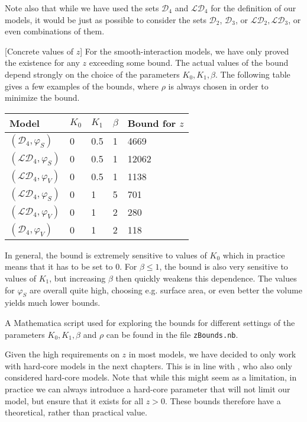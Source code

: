 Note also that while we have used the sets $\mathcal D_4$ and $\mathcal {LD}_4$ for the definition of our models, it would be just as possible to consider the sets $\mathcal D_2$, $\mathcal D_3$, or $\mathcal {LD}_2, \mathcal {LD}_3$, or even combinations of them.

\begin{remark}\label{r:zMathematica}[Concrete values of $z$]
	For the smooth-interaction models, we have only proved the existence for any $z$ exceeding some bound. The actual values of the bound depend strongly on the choice of the parameters $K_0,K_1,\beta$. The following table gives a few examples of the bounds, where $\rho$ is always chosen in order to minimize the bound.
	\begin{center}
	\begin{tabular}{ l l l l l }
		Model & $K_0$ & $K_1$ & $\beta$ & Bound for $z$ \\
		\hline
		$(\mathcal D_4,\varphi_S)$ &  0 & 0.5 & 1 & 4669 \\
		$(\mathcal {LD}_4,\varphi_S)$ &  0 & 0.5 & 1 & 12062 \\
		$(\mathcal {LD}_4,\varphi_{V})$ &  0 & 0.5 & 1 & 1138 \\
		$(\mathcal {LD}_4,\varphi_S)$ &  0 & 1 & 5 & 701 \\
		$(\mathcal {LD}_4,\varphi_V)$ &  0 & 1 & 2 & 280 \\
		$(\mathcal {D}_4,\varphi_V)$ &  0 & 1 & 2 & 118 \\
	\end{tabular}
	\end{center}
	In general, the bound is extremely sensitive to values of $K_0$ which in practice means that it has to be set to $0$. For $\beta \leq 1$, the bound is also very sensitive to values of $K_1$, but increasing $\beta$ then quickly weakens this dependence. The values for $\varphi_S$ are overall quite high, choosing e.g. surface area, or even better the volume yields much lower bounds.

	A Mathematica script used for exploring the bounds for different settings of the parameters $K_0,K_1,\beta$ and $\rho$ can be found in the file \texttt{zBounds.nb}.
\end{remark}

Given the high requirements on $z$ in most models, we have decided to only work with hard-core models in the next chapters. This is in line with \cite{DereudreLavancier2011}, who also only considered hard-core models. Note that while this might seem as a limitation, in practice we can always introduce a hard-core parameter that will not limit our model, but ensure that it exists for all $z>0$. These bounds therefore have a theoretical, rather than practical value.


